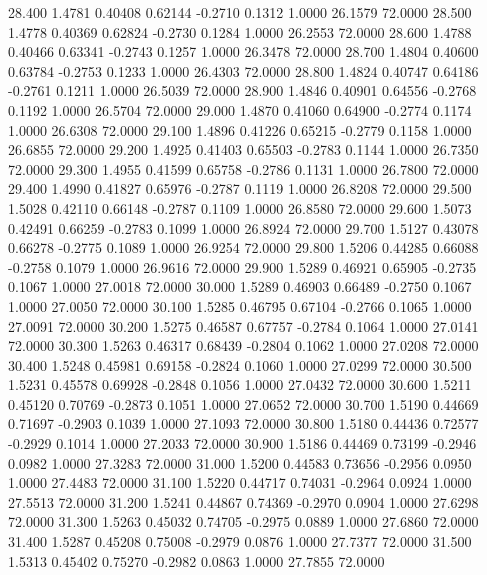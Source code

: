  28.400   1.4781   0.40408   0.62144  -0.2710   0.1312   1.0000  26.1579  72.0000
  28.500   1.4778   0.40369   0.62824  -0.2730   0.1284   1.0000  26.2553  72.0000
  28.600   1.4788   0.40466   0.63341  -0.2743   0.1257   1.0000  26.3478  72.0000
  28.700   1.4804   0.40600   0.63784  -0.2753   0.1233   1.0000  26.4303  72.0000
  28.800   1.4824   0.40747   0.64186  -0.2761   0.1211   1.0000  26.5039  72.0000
  28.900   1.4846   0.40901   0.64556  -0.2768   0.1192   1.0000  26.5704  72.0000
  29.000   1.4870   0.41060   0.64900  -0.2774   0.1174   1.0000  26.6308  72.0000
  29.100   1.4896   0.41226   0.65215  -0.2779   0.1158   1.0000  26.6855  72.0000
  29.200   1.4925   0.41403   0.65503  -0.2783   0.1144   1.0000  26.7350  72.0000
  29.300   1.4955   0.41599   0.65758  -0.2786   0.1131   1.0000  26.7800  72.0000
  29.400   1.4990   0.41827   0.65976  -0.2787   0.1119   1.0000  26.8208  72.0000
  29.500   1.5028   0.42110   0.66148  -0.2787   0.1109   1.0000  26.8580  72.0000
  29.600   1.5073   0.42491   0.66259  -0.2783   0.1099   1.0000  26.8924  72.0000
  29.700   1.5127   0.43078   0.66278  -0.2775   0.1089   1.0000  26.9254  72.0000
  29.800   1.5206   0.44285   0.66088  -0.2758   0.1079   1.0000  26.9616  72.0000
  29.900   1.5289   0.46921   0.65905  -0.2735   0.1067   1.0000  27.0018  72.0000
  30.000   1.5289   0.46903   0.66489  -0.2750   0.1067   1.0000  27.0050  72.0000
  30.100   1.5285   0.46795   0.67104  -0.2766   0.1065   1.0000  27.0091  72.0000
  30.200   1.5275   0.46587   0.67757  -0.2784   0.1064   1.0000  27.0141  72.0000
  30.300   1.5263   0.46317   0.68439  -0.2804   0.1062   1.0000  27.0208  72.0000
  30.400   1.5248   0.45981   0.69158  -0.2824   0.1060   1.0000  27.0299  72.0000
  30.500   1.5231   0.45578   0.69928  -0.2848   0.1056   1.0000  27.0432  72.0000
  30.600   1.5211   0.45120   0.70769  -0.2873   0.1051   1.0000  27.0652  72.0000
  30.700   1.5190   0.44669   0.71697  -0.2903   0.1039   1.0000  27.1093  72.0000
  30.800   1.5180   0.44436   0.72577  -0.2929   0.1014   1.0000  27.2033  72.0000
  30.900   1.5186   0.44469   0.73199  -0.2946   0.0982   1.0000  27.3283  72.0000
  31.000   1.5200   0.44583   0.73656  -0.2956   0.0950   1.0000  27.4483  72.0000
  31.100   1.5220   0.44717   0.74031  -0.2964   0.0924   1.0000  27.5513  72.0000
  31.200   1.5241   0.44867   0.74369  -0.2970   0.0904   1.0000  27.6298  72.0000
  31.300   1.5263   0.45032   0.74705  -0.2975   0.0889   1.0000  27.6860  72.0000
  31.400   1.5287   0.45208   0.75008  -0.2979   0.0876   1.0000  27.7377  72.0000
  31.500   1.5313   0.45402   0.75270  -0.2982   0.0863   1.0000  27.7855  72.0000
